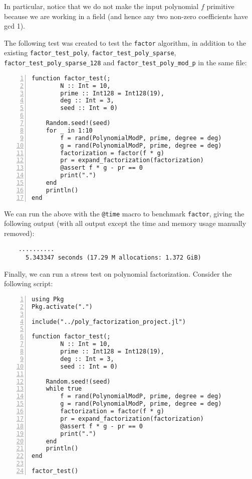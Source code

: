 \documentclass{article}
\theoremstyle{plain}
\numberwithin{theorem}{section}
\numberwithin{example}{section}
\theoremstyle{definition}
\numberwithin{definition}{section}
\begin{document}
In particular, notice that we do not make the input polynomial $f$ primitive
because we are working in a field (and hence any two non-zero coefficients have
gcd 1). \medbreak

The following test was created to test the \texttt{factor} algorithm, in
addition to the existing \texttt{factor\_test\_poly},
\texttt{factor\_test\_poly\_sparse}, \texttt{factor\_test\_poly\_sparse\_128}
and \texttt{factor\_test\_poly\_mod\_p} in the same file:

\begin{codebox}
    \begin{Verbatim}[numbers=left,xleftmargin=5mm]
function factor_test(;
        N :: Int = 10,
        prime :: Int128 = Int128(19),
        deg :: Int = 3,
        seed :: Int = 0)

    Random.seed!(seed)
    for _ in 1:10
        f = rand(PolynomialModP, prime, degree = deg)
        g = rand(PolynomialModP, prime, degree = deg)
        factorization = factor(f * g)
        pr = expand_factorization(factorization)
        @assert f * g - pr == 0
        print(".")
    end
    println()
end
    \end{Verbatim}
\end{codebox}

We can run the above with the \texttt{@time} macro to benchmark \texttt{factor},
giving the following output (with all output except the time and memory usage
manually removed):

\begin{Verbatim}
    ..........
      5.343347 seconds (17.29 M allocations: 1.372 GiB)
\end{Verbatim}

Finally, we can run a stress test on polynomial factorization. Consider the
following script:

\begin{codebox}
    \begin{Verbatim}[numbers=left,xleftmargin=5mm]
using Pkg
Pkg.activate(".")

include("../poly_factorization_project.jl")

function factor_test(;
        N :: Int = 10,
        prime :: Int128 = Int128(19),
        deg :: Int = 3,
        seed :: Int = 0)

    Random.seed!(seed)
    while true
        f = rand(PolynomialModP, prime, degree = deg)
        g = rand(PolynomialModP, prime, degree = deg)
        factorization = factor(f * g)
        pr = expand_factorization(factorization)
        @assert f * g - pr == 0
        print(".")
    end
    println()
end

factor_test()
    \end{Verbatim}
\end{codebox}
\end{document}
